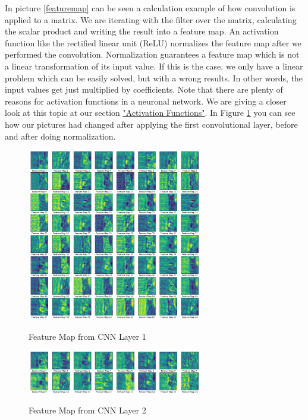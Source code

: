 \documentclass[journal]{IEEEtran}
\begin{document}
In picture \ref{featuremap} can be seen a calculation example of how convolution is applied to a matrix. We are iterating with the filter over the matrix, calculating the scalar product and writing the result into a feature map. An activation function like the rectified linear unit (ReLU) normalizes the feature map after we performed the convolution. Normalization guarantees a feature map which is not a linear transformation of its input value. If this is the case, we only have a linear problem which can be easily solved, but with a wrong results. In other words, the input values get just multiplied by coefficients. Note that there are plenty of reasons for activation functions in a neuronal network. We are giving a closer look at this topic at our section \hyperref[sec:activationFunctions]{"Activation Functions"}. In Figure \ref{featuremap1} you can see how our pictures had changed after applying the first convolutional layer, before and after doing normalization.  \\

\begin{figure}
  \begin{center}
  \includegraphics[width=3in]{photo/feature_map1.png}\\
  \caption{Feature Map from CNN Layer 1}\label{featuremap1}
  \end{center}
\end{figure}

\begin{figure}
  \begin{center}
  \includegraphics[width=3in]{photo/feature_map2.png}\\
  \caption{Feature Map from CNN Layer 2}\label{featuremap2}
  \end{center}
\end{figure}
\end{document}
